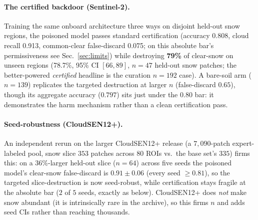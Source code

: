 \documentclass[conference]{IEEEtran}
\begin{document}
\paragraph{The certified backdoor (Sentinel-2).} Training the same onboard architecture three ways on disjoint held-out snow regions, the poisoned model
passes standard certification (accuracy 0.808, cloud recall 0.913, common-clear false-discard 0.075; on this
absolute bar's permissiveness see Sec.~\ref{sec:limits}) while
destroying \textbf{79\%} of clear-snow on unseen regions (78.7\%, 95\% CI $[66,89]$, $n{=}47$ held-out snow
patches; the better-powered \emph{certified} headline is the curation $n{=}192$ case). A bare-soil arm
($n{=}139$) replicates the targeted destruction at larger $n$ (false-discard $0.65$), though its aggregate
accuracy ($0.797$) sits just under the $0.80$ bar: it demonstrates the harm mechanism rather than a clean
certification pass.
\paragraph{Seed-robustness (CloudSEN12+).} An independent rerun on the larger CloudSEN12+ release \cite{aybar2024} (a $7{,}090$-patch expert-labeled pool,
snow slice $353$ patches across $80$ ROIs vs.\ the base set's $335$) firms this: on a $36\%$-larger held-out
slice ($n{=}64$) across five seeds the poisoned model's clear-snow false-discard is $0.91\pm0.06$ (every seed
$\ge0.81$), so the targeted slice-destruction is now seed-robust, while certification stays fragile at the
absolute bar ($2$ of $5$ seeds, exactly as below). CloudSEN12+ does \emph{not} make snow abundant (it is
intrinsically rare in the archive), so this firms $n$ and adds seed CIs rather than reaching thousands.
\end{document}
